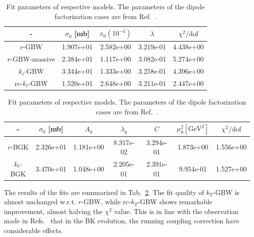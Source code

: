 \documentclass[11pt]{article}
\begin{document}
\begin{table}[t]
\begin{subtable}{\textwidth}
\center\footnotesize
\begin{tabular}{|c|c|c|c|c|}
	\hline - & $\sigma_0 $ [mb] & $x_0 \left(10^{-4}\right)$ & $\lambda$ & $\chi^2/\mathrm{dof}$ \\\hline 
	{\footnotesize $r$-GBW} & 1.907e+01& 2.582e+00& 3.219e-01& 4.438e+00\\\hline 
	{\footnotesize $r$-GBW-massive} & 2.384e+01& 1.117e+00& 3.082e-01& 5.274e+00\\\hline 
	{\footnotesize $k_t$-GBW} & 3.344e+01& 1.333e+00& 3.258e-01& 4.396e+00\\\hline 
	{\footnotesize rc-$k_t$-GBW} & 1.520e+01& 2.648e+00& 3.211e-01& 2.447e+00\\\hline 
\end{tabular}
\vspace{2mm}
\end{subtable}
\begin{subtable}{\textwidth}
\center\footnotesize
\begin{tabular}{|c|c|c|c|c|c|c|}
	\hline - & $\sigma_0 $ [mb] & $A_g$ & $\lambda_g$ & $C$ & $\mu_0^2 \left[\mathrm{GeV^2}\right]$ & $\chi^2/\mathrm{dof}$ \\\hline 
	{\footnotesize $r$-BGK} & 2.326e+01& 1.181e+00& 8.317e-02& 3.294e-01& 1.873e+00& 1.556e+00\\\hline 
	{\footnotesize $k_t$-BGK} & 3.470e+01& 1.048e+00& 2.205e-01&2.391e-01& 9.954e-01&  1.527e+00\\\hline 
\end{tabular}
\vspace{2mm}
\end{subtable}
\caption{Fit parameters of respective models. The parameters of the
dipole factorization cases are from Ref.~\cite{Goda:2022wsc}.}
\label{tab:table}
\end{table}

The results of the fits are summarized in Tab.~\ref{tab:table}. 
The fit quality of $k_T$-GBW is almost unchanged w.r.t. $r$-GBW, while rc-$k_T$-GBW shows remarkable improvement, almost halving the $\chi^2$ value.
This is in line with the observation made in Refs.~\cite{Albacete:2004gw,Albacete:2007yr,Albacete:2010sy} that in the BK evolution, the running coupling correction have considerable effects.
\end{document}
